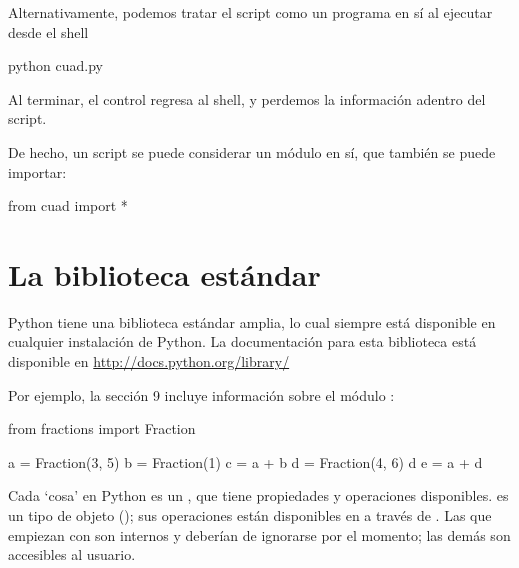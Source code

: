 Alternativamente, podemos tratar el script como un programa en sí al ejecutar desde el shell
\begin{python}
python cuad.py
\end{python}
Al terminar, el control regresa al shell, y perdemos la información adentro del script.

De hecho, un script se puede considerar un módulo en sí, que también se puede importar:
\begin{python}
from cuad import *
\end{python}





\section{La biblioteca estándar}
Python tiene una biblioteca estándar amplia, lo cual siempre está disponible en cualquier instalación de Python.
La documentación para esta biblioteca está disponible en \url{http://docs.python.org/library/}

Por ejemplo, la sección 9 incluye información sobre el módulo :
\begin{python}
from fractions import Fraction

a = Fraction(3, 5)
b = Fraction(1)
c = a + b
d = Fraction(4, 6)
d
e = a + d
\end{python}

Cada `cosa' en Python es un , que tiene propiedades y operaciones disponibles.
 es un tipo de objeto (); sus operaciones están disponibles en  a través de
. Las que empiezan con \inl{__} son internos y deberían de ignorarse por el momento; las demás son accesibles al usuario.

